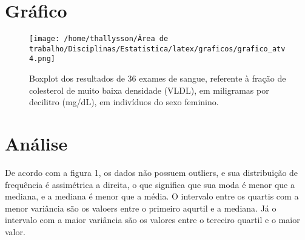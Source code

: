 \documentclass{article}
\begin{document}
	
	
	

	\section*{Gráfico}
	\begin{figure}[H]
		\centering
		\caption{Boxplot dos resultados de 36 exames de sangue, referente à fração de colesterol de muito baixa
			densidade (VLDL), em miligramas por decilitro (mg/dL), em indivíduos do sexo feminino.}
		\texttt{[image: /home/thallysson/Área de trabalho/Disciplinas/Estatistica/latex/graficos/grafico\_atv4.png]} %
		
		\label{fig:grafico_filhos}
	\end{figure}
	
	\section*{Análise}
	De acordo com a figura 1, os dados não possuem outliers, e sua distribuição de frequência é assimétrica a direita, o que significa que sua moda é menor que a mediana, e a mediana é menor que a média. O intervalo entre os quartis com a menor variância são os valoers entre o primeiro aqurtil e a mediana. Já o intervalo com a maior variância são os valores entre o terceiro quartil e o maior valor.
	
	
\end{document}
